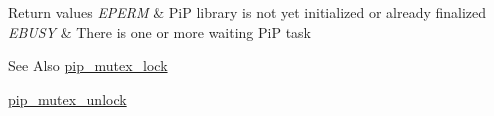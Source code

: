 \begin{DoxyRetVals}{Return values}
{\em E\-P\-E\-R\-M} & Pi\-P library is not yet initialized or already finalized \\
\hline
{\em E\-B\-U\-S\-Y} & There is one or more waiting Pi\-P task\\
\hline
\end{DoxyRetVals}
\begin{DoxySeeAlso}{See Also}
\hyperlink{group__ULP-5-mutex_ga14f77d2413590f58d7a45a3b56960c90}{pip\-\_\-mutex\-\_\-lock} 

\hyperlink{group__ULP-5-mutex_ga370bb79d84360fdb96169fc5cea789ee}{pip\-\_\-mutex\-\_\-unlock} 
\end{DoxySeeAlso}

